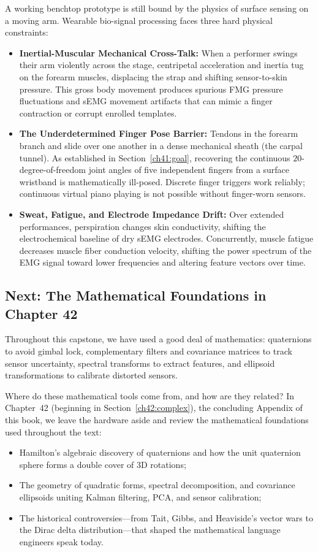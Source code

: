 A working benchtop prototype is still bound by the physics of surface sensing on a moving arm. Wearable bio-signal processing faces three hard physical constraints:
\begin{itemize}
  \item \textbf{Inertial-Muscular Mechanical Cross-Talk:} When a performer swings their arm violently across the stage, centripetal acceleration and inertia tug on the forearm muscles, displacing the strap and shifting sensor-to-skin pressure. This gross body movement produces spurious FMG pressure fluctuations and sEMG movement artifacts that can mimic a finger contraction or corrupt enrolled templates.
  \item \textbf{The Underdetermined Finger Pose Barrier:} Tendons in the forearm branch and slide over one another in a dense mechanical sheath (the carpal tunnel). As established in Section~\ref{ch41:goal}, recovering the continuous $20$-degree-of-freedom joint angles of five independent fingers from a surface wristband is mathematically ill-posed. Discrete finger triggers work reliably; continuous virtual piano playing is not possible without finger-worn sensors.
  \item \textbf{Sweat, Fatigue, and Electrode Impedance Drift:} Over extended performances, perspiration changes skin conductivity, shifting the electrochemical baseline of dry sEMG electrodes. Concurrently, muscle fatigue decreases muscle fiber conduction velocity, shifting the power spectrum of the EMG signal toward lower frequencies and altering feature vectors over time.
\end{itemize}

\subsection{Next: The Mathematical Foundations in Chapter 42}

Throughout this capstone, we have used a good deal of mathematics: quaternions to avoid gimbal lock, complementary filters and covariance matrices to track sensor uncertainty, spectral transforms to extract features, and ellipsoid transformations to calibrate distorted sensors.

Where do these mathematical tools come from, and how are they related? In Chapter~42 (beginning in Section~\ref{ch42:complex}), the concluding Appendix of this book, we leave the hardware aside and review the mathematical foundations used throughout the text:
\begin{itemize}
  \item Hamilton's algebraic discovery of quaternions and how the unit quaternion sphere forms a double cover of 3D rotations;
  \item The geometry of quadratic forms, spectral decomposition, and covariance ellipsoids uniting Kalman filtering, PCA, and sensor calibration;
  \item The historical controversies---from Tait, Gibbs, and Heaviside's vector wars to the Dirac delta distribution---that shaped the mathematical language engineers speak today.
\end{itemize}

